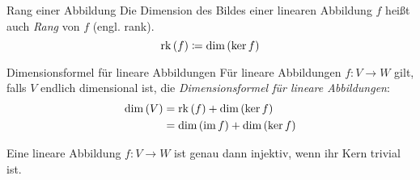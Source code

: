 \begin{definition}{Rang einer Abbildung}
  Die Dimension des Bildes einer linearen Abbildung $f$ heißt auch \emph{Rang} von $f$ (engl. rank).
  \begin{equation*}
    \mathrm{rk}\left(f\right) \coloneqq \mathrm{dim}\left(\mathrm{ker}\,f\right)
  \end{equation*}
\end{definition}

\begin{satz}{Dimensionsformel für lineare Abbildungen}
  Für lineare Abbildungen $f:V\rightarrow W$ gilt, falls $V$ endlich dimensional ist, die \emph{Dimensionsformel für lineare Abbildungen}:
  \begin{align*}
    \mathrm{dim}\left(V\right)&=\mathrm{rk}\left(f\right)+\mathrm{dim}\left(\mathrm{ker}\,f\right)\\
    &=\mathrm{dim}\left(\mathrm{im}\,f\right)+\mathrm{dim}\left(\mathrm{ker}\,f\right)
  \end{align*}
\end{satz}

\begin{lemma}{}
  Eine lineare Abbildung $f:V\rightarrow W$ ist genau dann injektiv, wenn ihr Kern trivial ist.
\end{lemma}
